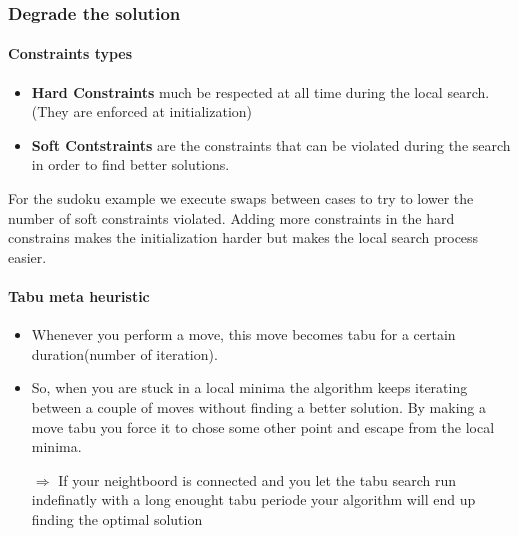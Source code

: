 \subsubsection{Degrade the solution}

\paragraph{Constraints types}
\begin{itemize}
    \item \textbf{Hard Constraints} much be respected at all
        time during the local search. (They are enforced at
        initialization)

    \item \textbf{Soft Contstraints} are the constraints that
        can be violated during the search in order to find
        better solutions.
\end{itemize}

For the sudoku example we execute swaps between cases to try to
lower the number of soft constraints violated. Adding more
constraints in the hard constrains makes the initialization
harder but makes the local search process easier.

\paragraph{Tabu meta heuristic}

\begin{itemize}
    \item Whenever you perform a move, this move becomes tabu for a certain
        duration(number of iteration). 
    \item So, when you are stuck in a local minima the
        algorithm keeps iterating between a couple of moves without finding a
        better solution. By making a move tabu you force it to chose some other
        point and escape from the  local minima.

    \item[$\Rightarrow$] If your neightboord is connected and you let the tabu search run
        indefinatly with a long enought tabu periode your algorithm will end up
        finding the optimal solution
\end{itemize}

